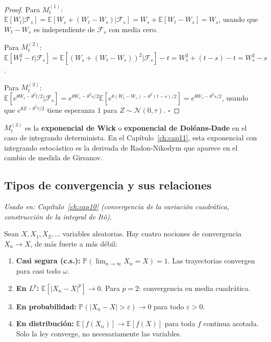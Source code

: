 \begin{proof}
Para $M_t^{(1)}$: $\mathbb{E}[W_t|\mathcal{F}_s] = \mathbb{E}[W_s +
(W_t-W_s)|\mathcal{F}_s] = W_s + \mathbb{E}[W_t-W_s] = W_s$, usando que
$W_t-W_s$ es independiente de $\mathcal{F}_s$ con media cero.

Para $M_t^{(2)}$: $\mathbb{E}[W_t^2-t|\mathcal{F}_s] = \mathbb{E}[(W_s+
(W_t-W_s))^2|\mathcal{F}_s] - t = W_s^2 + (t-s) - t = W_s^2 - s$.

Para $M_t^{(3)}$: $\mathbb{E}[e^{\theta W_t - \theta^2 t/2}|\mathcal{F}_s]
= e^{\theta W_s - \theta^2 s/2}\mathbb{E}[e^{\theta(W_t-W_s) - \theta^2(t-s)/2}]
= e^{\theta W_s - \theta^2 s/2}$, usando que $e^{\theta Z - \theta^2\tau/2}$
tiene esperanza 1 para $Z\sim\mathcal{N}(0,\tau)$. $\square$
\end{proof}

$M_t^{(3)}$ es la \textbf{exponencial de Wick} o \textbf{exponencial de
Doléans-Dade} en el caso de integrando determinista. En el
Capítulo~\ref{ch:cap11}, esta exponencial con integrando estocástico es la
derivada de Radon-Nikodym que aparece en el cambio de medida de Girsanov.

\subsection{Tipos de convergencia y sus relaciones}
\label{subsec:ap_convergencia}

\textit{Usado en: Capítulo~\ref{ch:cap10} (convergencia de la variación
cuadrática, construcción de la integral de Itô).}

\medskip
Sean $X, X_1, X_2, \ldots$ variables aleatorias. Hay cuatro nociones de
convergencia $X_n \to X$, de más fuerte a más débil:

\begin{enumerate}
  \item \textbf{Casi segura (c.s.):} $\mathbb{P}(\lim_{n\to\infty} X_n = X) = 1$.
        Las trayectorias convergen para casi todo $\omega$.
  \item \textbf{En $L^p$:} $\mathbb{E}[|X_n - X|^p] \to 0$.
        Para $p=2$: convergencia en media cuadrática.
  \item \textbf{En probabilidad:} $\mathbb{P}(|X_n - X| > \varepsilon) \to 0$
        para todo $\varepsilon > 0$.
  \item \textbf{En distribución:} $\mathbb{E}[f(X_n)] \to \mathbb{E}[f(X)]$
        para toda $f$ continua acotada. Solo la ley converge, no necesariamente
        las variables.
\end{enumerate}

